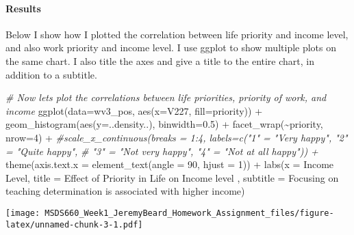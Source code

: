 \documentclass[
]{article}
\newenvironment{Shaded}{\begin{snugshade}}{\end{snugshade}}
\newcommand{\AttributeTok}[1]{\textcolor[rgb]{0.77,0.63,0.00}{#1}}
\newcommand{\CommentTok}[1]{\textcolor[rgb]{0.56,0.35,0.01}{\textit{#1}}}
\newcommand{\DecValTok}[1]{\textcolor[rgb]{0.00,0.00,0.81}{#1}}
\newcommand{\FloatTok}[1]{\textcolor[rgb]{0.00,0.00,0.81}{#1}}
\newcommand{\FunctionTok}[1]{\textcolor[rgb]{0.00,0.00,0.00}{#1}}
\newcommand{\NormalTok}[1]{#1}
\newcommand{\SpecialCharTok}[1]{\textcolor[rgb]{0.00,0.00,0.00}{#1}}
\newcommand{\StringTok}[1]{\textcolor[rgb]{0.31,0.60,0.02}{#1}}
\begin{document}
\hypertarget{results}{%
\paragraph{Results}\label{results}}

Below I show how I plotted the correlation between life priority and
income level, and also work priority and income level. I use ggplot to
show multiple plots on the same chart. I also title the axes and give a
title to the entire chart, in addition to a subtitle.

\begin{Shaded}
\begin{Highlighting}[]
\CommentTok{\# Now let\textquotesingle{}s plot the correlations between life priorities, priority of work, and income}
\FunctionTok{ggplot}\NormalTok{(}\AttributeTok{data=}\NormalTok{wv3\_pos, }\FunctionTok{aes}\NormalTok{(}\AttributeTok{x=}\NormalTok{V227, }\AttributeTok{fill=}\NormalTok{priority)) }\SpecialCharTok{+} 
  \FunctionTok{geom\_histogram}\NormalTok{(}\FunctionTok{aes}\NormalTok{(}\AttributeTok{y=}\NormalTok{..density..), }\AttributeTok{binwidth=}\FloatTok{0.5}\NormalTok{) }\SpecialCharTok{+}
  \FunctionTok{facet\_wrap}\NormalTok{(}\SpecialCharTok{\textasciitilde{}}\NormalTok{priority, }\AttributeTok{nrow=}\DecValTok{4}\NormalTok{) }\SpecialCharTok{+} 
  \CommentTok{\#scale\_x\_continuous(breaks = 1:4, labels=c("1" = "Very happy", "2" = "Quite happy",}
  \CommentTok{\#                                          "3" = "Not very happy", "4" = "Not at all happy")) +}
  \FunctionTok{theme}\NormalTok{(}\AttributeTok{axis.text.x =} \FunctionTok{element\_text}\NormalTok{(}\AttributeTok{angle =} \DecValTok{90}\NormalTok{, }\AttributeTok{hjust =} \DecValTok{1}\NormalTok{)) }\SpecialCharTok{+}
  \FunctionTok{labs}\NormalTok{(}\AttributeTok{x =} \StringTok{\textquotesingle{}Income Level\textquotesingle{}}\NormalTok{,}
       \AttributeTok{title =} \StringTok{\textquotesingle{}Effect of Priority in Life on Income level\textquotesingle{}}\NormalTok{ ,}
       \AttributeTok{subtitle =} \StringTok{\textquotesingle{}Focusing on teaching determination is associated with higher income\textquotesingle{}}\NormalTok{)}
\end{Highlighting}
\end{Shaded}

\texttt{[image: MSDS660\_Week1\_JeremyBeard\_Homework\_Assignment\_files/figure-latex/unnamed-chunk-3-1.pdf]}
\end{document}
